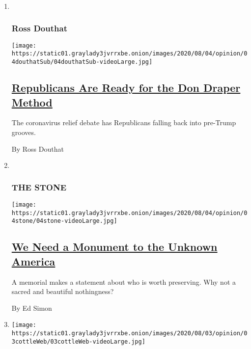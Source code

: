 \begin{enumerate}
\def\labelenumi{\arabic{enumi}.}
\item ~
  \hypertarget{ross-douthat}{%
  \subsubsection{Ross Douthat}\label{ross-douthat}}

  \texttt{[image: https://static01.graylady3jvrrxbe.onion/images/2020/08/04/opinion/04douthatSub/04douthatSub-videoLarge.jpg]}

  \hypertarget{republicans-are-ready-for-the-don-draper-method}{%
  \subsection{\texorpdfstring{\href{/2020/08/04/opinion/trump-republicans-tea-party.html}{Republicans
  Are Ready for the Don Draper
  Method}}{Republicans Are Ready for the Don Draper Method}}\label{republicans-are-ready-for-the-don-draper-method}}

  The coronavirus relief debate has Republicans falling back into
  pre-Trump grooves.

  By Ross Douthat
\item ~
  \hypertarget{the-stone}{%
  \subsubsection{THE STONE}\label{the-stone}}

  \texttt{[image: https://static01.graylady3jvrrxbe.onion/images/2020/08/04/opinion/04stone/04stone-videoLarge.jpg]}

  \hypertarget{we-need-a-monument-to-the-unknown-america}{%
  \subsection{\texorpdfstring{\href{/2020/08/04/opinion/us-monuments-rome-unknown-god.html}{We
  Need a Monument to the Unknown
  America}}{We Need a Monument to the Unknown America}}\label{we-need-a-monument-to-the-unknown-america}}

  A memorial makes a statement about who is worth preserving. Why not a
  sacred and beautiful nothingness?

  By Ed Simon
\item
  \texttt{[image: https://static01.graylady3jvrrxbe.onion/images/2020/08/03/opinion/03cottleWeb/03cottleWeb-videoLarge.jpg]}


\end{enumerate}
